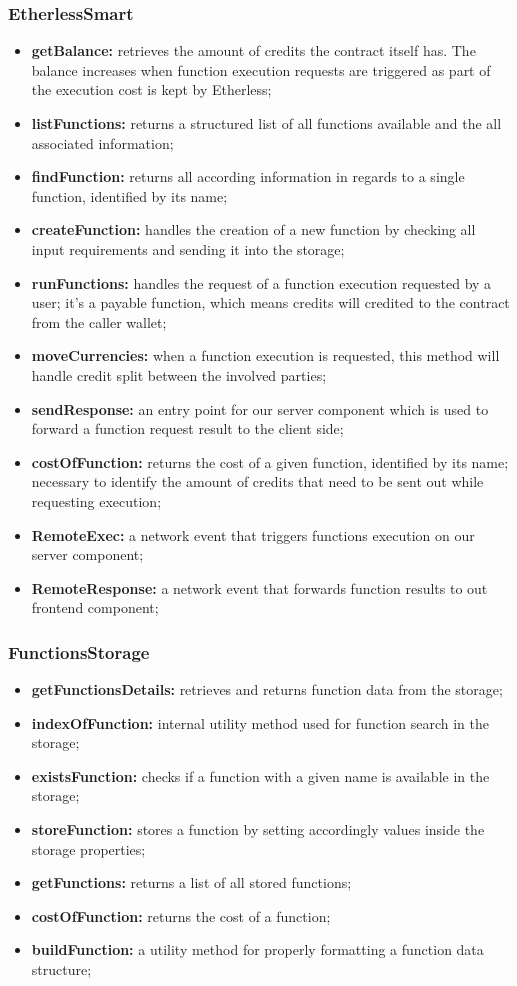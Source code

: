 \subsubsection{EtherlessSmart}
\begin{itemize}
	\item \textbf{getBalance:} retrieves the amount of credits the contract itself has. The balance increases when function execution requests are triggered as part of the execution cost is kept by Etherless;
	\item \textbf{listFunctions:} returns a structured list of all functions available and the all associated information; 
	\item \textbf{findFunction:} returns all according information in regards to a single function, identified by its name; 
	\item \textbf{createFunction:} handles the creation of a new function by checking all input requirements and sending it into the storage;
	\item \textbf{runFunctions:} handles the request of a function execution requested by a user; it's a payable function, which means credits will credited to the contract from the caller wallet;
	\item \textbf{moveCurrencies:} when a function execution is requested, this method will handle credit split between the involved parties;
	\item \textbf{sendResponse:} an entry point for our server component which is used to forward a function request result to the client side;
	\item \textbf{costOfFunction:} returns the cost of a given function, identified by its name; necessary to identify the amount of credits that need to be sent out while requesting execution;
	\item \textbf{RemoteExec:} a network event that triggers functions execution on our server component;
	\item \textbf{RemoteResponse:} a network event that forwards function results to out frontend component;
\end{itemize}
\subsubsection{FunctionsStorage}
\begin{itemize}
	\item \textbf{getFunctionsDetails:} retrieves and returns function data from the storage;
	\item \textbf{indexOfFunction:} internal utility method used for function search in the storage;
	\item \textbf{existsFunction:} checks if a function with a given name is available in the storage;
	\item \textbf{storeFunction:} stores a function by setting accordingly values inside the storage properties;
	\item \textbf{getFunctions:} returns a list of all stored functions;
	\item \textbf{costOfFunction:}  returns the cost of a function;
	\item \textbf{buildFunction:} a utility method for properly formatting a function data structure;
\end{itemize}
